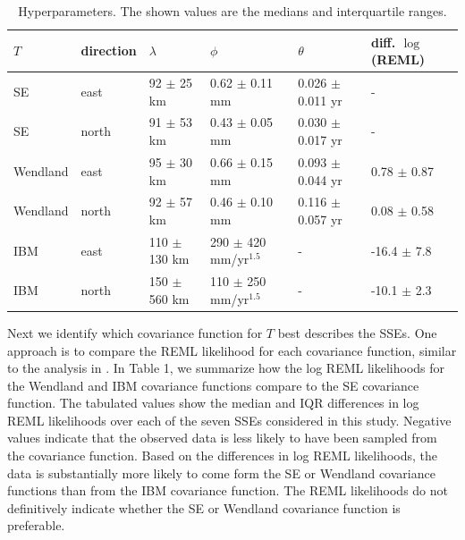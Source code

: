 \documentclass[10pt,a4paper]{article}
\begin{document}
\begin{table}\label{tab:Parameters}
\begin{tabular} {l l l l l l}
$T$ & direction & $\lambda$  & $\phi$   & $\theta$  & diff. $\log$(REML) \\ \hline
SE & east   & 92 $\pm$ 25 km  & 0.62 $\pm$ 0.11 mm  & 0.026 $\pm$ 0.011 yr  &  - \\
SE & north  & 91 $\pm$ 53 km  & 0.43 $\pm$ 0.05 mm  & 0.030 $\pm$ 0.017 yr  &  - \\
Wendland & east   & 95 $\pm$ 30 km  & 0.66 $\pm$ 0.15 mm  & 0.093 $\pm$ 0.044 yr &  0.78 $\pm$ 0.87 \\
Wendland & north  & 92 $\pm$ 57 km  & 0.46 $\pm$ 0.10 mm  & 0.116 $\pm$ 0.057 yr &  0.08 $\pm$ 0.58 \\
IBM & east   & 110 $\pm$ 130 km & 290 $\pm$ 420 mm/yr$^{1.5}$  & -          & -16.4 $\pm$ 7.8 \\
IBM & north  & 150 $\pm$ 560 km & 110 $\pm$ 250 mm/yr$^{1.5}$ & -           & -10.1 $\pm$ 2.3 \\
\end{tabular}
\caption{Hyperparameters. The shown values are the medians and interquartile ranges.} 
\end{table}


Next we identify which covariance function for $T$ best describes the SSEs. One approach is to compare the REML likelihood for each covariance function, similar to the analysis in \citet{Langbein2004}. In Table 1, we summarize how the log REML likelihoods for the Wendland and IBM covariance functions compare to the SE covariance function.  The tabulated values show the median and IQR differences in log REML likelihoods over each of the seven SSEs considered in this study. Negative values indicate that the observed data is less likely to have been sampled from the covariance function. Based on the differences in log REML likelihoods, the data is substantially more likely to come form the SE or Wendland covariance functions than from the IBM covariance function. The REML likelihoods do not definitively indicate whether the SE or Wendland covariance function is preferable. 
\end{document}
